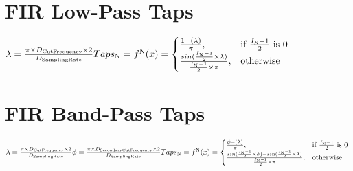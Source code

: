 \documentclass{article}
\begin{document}
\section{FIR Low-Pass Taps}
$
\lambda = \frac{\pi \times D_\textrm{CutFrequency} \times 2} {D_\textrm{SamplingRate}}\\
\newline
Taps_\textrm{N} = f^\textrm{N} (x) = \begin{cases}
    \frac{1 - (\lambda)} {\pi}, & \text{if } \frac{I_\textrm{N} - 1} {2} \text{ is 0}\\
    \frac{sin(\frac{I_\textrm{N} - 1} {2} \times \lambda)} {\frac{I_\textrm{N} - 1} {2} \times \pi}, & \textrm{otherwise}\\
\end{cases}
$


\section{FIR Band-Pass Taps}
$
\lambda = \frac{\pi \times D_\textrm{CutFrequency} \times 2} {D_\textrm{SamplingRate}}\\
\newline
\phi = \frac{\pi \times D_\textrm{SecondaryCutFrequency} \times 2} {D_\textrm{SamplingRate}}\\
\newline
Taps_\textrm{N} = f^\textrm{N} (x) = \begin{cases}
    \frac{\phi - (\lambda)} {\pi}, & \text{if } \frac{I_\textrm{N} - 1} {2} \text{ is 0}\\
    \frac{sin(\frac{I_\textrm{N} - 1} {2} \times \phi) - sin(\frac{I_\textrm{N} - 1} {2} \times \lambda)} {\frac{I_\textrm{N} - 1} {2} \times \pi}, & \textrm{otherwise}\\
\end{cases}
\newline
\newline
\newline
\newline
\newline
\newline
\newline
\newline
\newline
\newline
\newline
$
\end{document}
